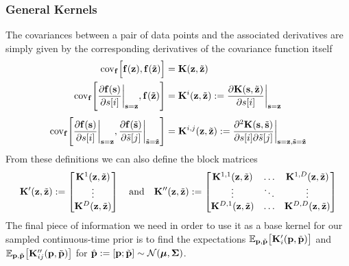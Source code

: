 \subsubsection{General Kernels}
The covariances between a pair of data points and the associated derivatives are simply given by the corresponding derivatives of the covariance function itself
\begin{align*}
\cov_{\bff}\Big[\bff(\bz), \bff(\tilde\bz)\Big] &= \bK(\bz,\tilde\bz) \\
\cov_{\bff}\Bigg[\pdiff{\bff(\bs)}{s[i]}\bigg|_{\bs = \bz}, \bff(\tilde\bz) \Bigg] 
&= \bK^i(\bz,\tilde\bz) := \pdiff{\bK(\bs,\tilde\bz)}{s[i]}\bigg|_{\bs = \bz} \\[0.1cm]
\cov_{\bff}\Bigg[\pdiff{\bff(\bs)}{s[i]}\bigg|_{\bs = \bz}, \pdiff{\bff(\tbs)}{\tilde s[j]}\bigg|_{\tbs = \tbz} \Bigg] 
&= \bK^{i,j}(\bz,\tilde\bz) := \pdiff{^2\bK(\bs,\tbs)}{s[i]\partial \tilde s[j]}\bigg|_{\bs = \bz,\tbs = \tbz}
\end{align*}
From these definitions we can also define the block matrices
\begin{equation*}
\bK'(\bz,\tbz) := \bmat{\bK^1(\bz,\tilde\bz) \\ \vdots \\ \bK^D(\bz,\tilde\bz)} 
\quad \text{and} \quad
\bK''(\bz,\tbz) := \bmat{\bK^{1,1}(\bz,\tilde\bz) & \dots & \bK^{1,D}(\bz,\tilde\bz) \\ 
\vdots & \ddots & \vdots \\ \bK^{D,1}(\bz,\tilde\bz) & \dots & \bK^{D,D}(\bz,\tilde\bz)} 
\end{equation*}
The final piece of information we need in order to use it as a base kernel for our sampled continuous-time prior is to find the expectations $\EE_{\bp,\tbp}\big[\bK'_i(\bp,\tbp)\big]$ and $\EE_{\bp,\tbp}\big[\bK''_{ij}(\bp,\tbp)\big]$ for $\hbp := [\bp;\tbp] \sim \cN(\bm,\bS)$.


